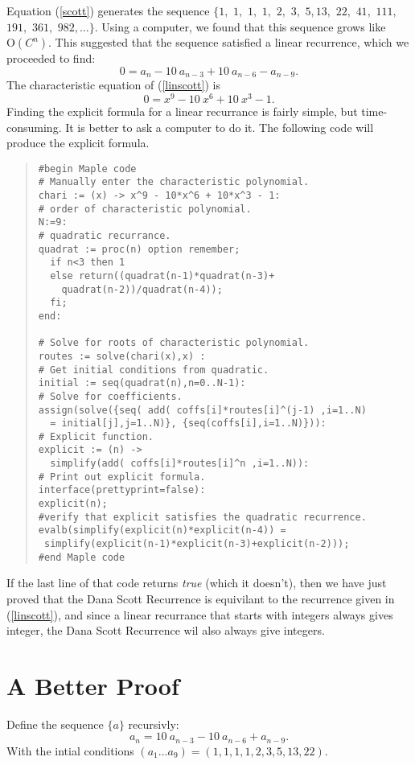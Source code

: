 \documentclass[10pt]{article}
\begin{document}
Equation (\ref{scott}) generates the sequence $\{1,$ $1,$ $1,$ $1,$
$2,$ $3,$ $5, 13,$ $22,$ $41,$ $111,$ $191,$ $361,$ $982,\ldots\}$.
Using a computer, we found that this sequence grows like
$\textrm{O}(C^n)$.  This suggested that the sequence satisfied a
linear recurrence, which we proceeded to find:
\begin{equation}\label{linscott}
0 = a_n - 10~ a_{n-3} + 10~ a_{n-6} - a_{n-9}.
\end{equation}
The characteristic equation of (\ref{linscott}) is
\[
0 = x^9 - 10~ x^6 + 10~ x^3 - 1.
\]
Finding the explicit formula for a linear recurrance is fairly simple,
but time-consuming.  It is better to ask a computer to do it.  The
following code will produce the explicit formula.
\begin{quote}
\begin{verbatim}
#begin Maple code
# Manually enter the characteristic polynomial.
chari := (x) -> x^9 - 10*x^6 + 10*x^3 - 1:
# order of characteristic polynomial.
N:=9:
# quadratic recurrance.
quadrat := proc(n) option remember;
  if n<3 then 1
  else return((quadrat(n-1)*quadrat(n-3)+
    quadrat(n-2))/quadrat(n-4));
  fi;
end:

# Solve for roots of characteristic polynomial.
routes := solve(chari(x),x) :
# Get initial conditions from quadratic.
initial := seq(quadrat(n),n=0..N-1):
# Solve for coefficients.
assign(solve({seq( add( coffs[i]*routes[i]^(j-1) ,i=1..N)
  = initial[j],j=1..N)}, {seq(coffs[i],i=1..N)})):
# Explicit function.
explicit := (n) ->
  simplify(add( coffs[i]*routes[i]^n ,i=1..N)):
# Print out explicit formula.
interface(prettyprint=false):
explicit(n);
#verify that explicit satisfies the quadratic recurrence.
evalb(simplify(explicit(n)*explicit(n-4)) =
 simplify(explicit(n-1)*explicit(n-3)+explicit(n-2)));
#end Maple code
\end{verbatim}
\end{quote}
If the last line of that code returns \emph{true} (which it doesn't),
then we have just proved that the Dana Scott Recurrence is equivilant
to the recurrence given in (\ref{linscott}), and since a linear
recurrance that starts with integers always gives integer, the Dana
Scott Recurrence wil also always give integers.

\section{A Better Proof}

Define the sequence $\{a\}$ recursivly:
\begin{equation}\label{linscott2}
	a_n = 10~ a_{n-3} - 10~ a_{n-6} + a_{n-9}.
\end{equation}
With the intial conditions 
$(a_1{}\ldots{}a_9 ) = (1, 1, 1, 1, 2, 3, 5, 13, 22)$.
\end{document}
